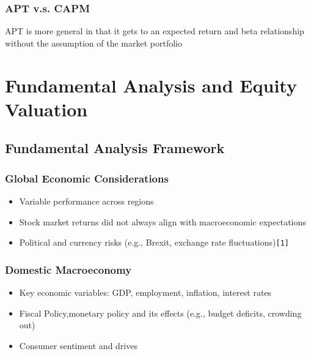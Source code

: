 \documentclass[
]{book}
\providecommand{\tightlist}{%
  \setlength{\itemsep}{0pt}\setlength{\parskip}{0pt}}
\begin{document}
\hypertarget{apt-v.s.-capm}{%
\subsection{APT v.s. CAPM}\label{apt-v.s.-capm}}

APT is more general in that it gets to an expected return and beta
relationship without the assumption of the market portfolio

\hypertarget{ch5}{%
\chapter{Fundamental Analysis and Equity Valuation}\label{ch5}}

\hypertarget{fundamental-analysis-framework}{%
\section{Fundamental Analysis
Framework}\label{fundamental-analysis-framework}}

\hypertarget{global-economic-considerations}{%
\subsection{Global Economic
Considerations}\label{global-economic-considerations}}

\begin{itemize}
\tightlist
\item
  Variable performance across regions
\item
  Stock market returns did not always align with macroeconomic
  expectations
\item
  Political and currency risks (e.g., Brexit, exchange rate
  fluctuations)\texttt{{[}1{]}}
\end{itemize}

\hypertarget{domestic-macroeconomy}{%
\subsection{Domestic Macroeconomy}\label{domestic-macroeconomy}}

\begin{itemize}
\tightlist
\item
  Key economic variables: GDP, employment, inflation, interest rates
\item
  Fiscal Policy,monetary policy and its effects (e.g., budget deficits,
  crowding out)
\item
  Consumer sentiment and drives
\end{itemize}
\end{document}

